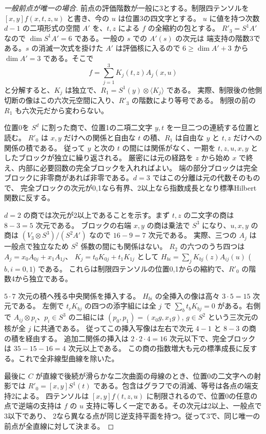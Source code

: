 \begin{proof}[一般前点が唯一の場合]
前点の評価階数が一般に3とする。制限四テンソルを
$[x,y]f(x,t,z,u)$ と書き、今の $u$ は位置3の四文字とする。
$u$ に値を持つ次数 $d-1$ の二項形式の空間 $A'$ を、$t,z$ による $f$ の全縮約の包とする。
$R'_3=S^1 A'$ なので $\dim S^1 A'=6$ である。一般の $s$ での $A'(s)$ の次元は
端支持の階数3である。$s$ の消滅一次式を掛けた $A'$ は評価核に入るので
$6\ge\dim A'+3$ から $\dim A'=3$ である。そこで
\[
               f=\sum_{j=1}^3 K_j(t,z) A_j(x,u)
\]
と分解すると、$K_j$ は独立で、$R_1=S^1(y)\otimes\langle K_j\rangle$ である。
実際、制限後の他側切断の像はこの六次元空間に入り、$R'_3$ の階数により等号である。
制限の前の $R_1$ も六次元だから変わらない。

位置0を $S^d$ に割った商で、位置1の二項二文字 $y,t$ を一旦二つの連続する位置と読む。
$R'_0$ は $x,y$ だけへの関係と自由な $t$ の積、$R_1$ は自由な $y$ と $t,z$ だけへの関係の積である。
従って $y$ と次の $t$ の間には関係がなく、一期を $t,z,u,x,y$ としたブロックが独立に繰り返される。
厳密には元の経路を $z$ から始め $x$ で終え、内部に必要回数の完全ブロックを入れればよい。
端の部分ブロックは完全ブロックに非零商があれば非零である。$d=3$ ではこの分離は元の代数そのもので、
完全ブロックの次元が0,1なら有界、2以上なら指数成長となり標準Hilbert関数に反する。

$d=2$ の商では次元が2以上であることを示す。まず $t,z$ の二文字の商は $8-3=5$ 次元である。
ブロックの右端 $x,y$ の商は乗法で $S^3$ になり、$u,x,y$ の商は
$(V_3\otimes S^3)/(S^2 A')$ なので $16-9=7$ 次元である。
実際、三つの $A_j$ は一般点で独立なため $S^2$ 係数の間にも関係はない。
$R_2$ の六つのうち四つは $A_j=x_0 A_{0j}+x_1 A_{1j}$、
$K_j=t_0 K_{0j}+t_1 K_{1j}$ として
$H_{bi}=\sum_j K_{bj}(z) A_{ij}(u)$ ($b,i=0,1$) である。
これらは制限四テンソルの位置0,1からの縮約で、$R'_0$ の階数4から独立である。

$5\cdot7$ 次元の積へ残る中央関係を挿入する。
$H_{bi}$ の全挿入の像は高々 $3\cdot5=15$ 次元である。
左側で $t_c K_{bj}$ の四つの添字組には全 $j$ で
$\sum_b t_b K_{bj}=0$ がある。右側で $A_{ij}\otimes p_i$、$p_i\in S^3$ の二組には
$(p_0,p_1)=(x_0g,x_1g)$, $g\in S^2$ という三次元の核が全 $j$ に共通である。
従ってこの挿入写像は左右で次元 $4-1$ と $8-3$ の商の積を経由する。
追加二関係の挿入は $2\cdot2\cdot4=16$ 次元以下で、完全ブロックは $35-15-16=4$ 次元以上である。
この商の指数増大も元の標準成長に反する。これで全非線型曲線を除いた。

最後に $C$ が直線で後続が滑らかな二次曲面の母線のとき、位置0の二文字への射影では
$R'_0=[x,y]S^1(t)$ である。包含はグラフでの消滅、等号は各点の端支持2による。
四テンソルは $[x,y]f(t,z,u)$ に制限されるので、位置0の任意の点で逆端の支持は
$f$ の $u$ 支持に等しく一定である。その次元は2以上、一般点で3以下であり、
2なら異なる点が同じ逆支持平面を持つ。従って3で、同じ唯一の前点が全直線に対して決まる。
\end{proof}
